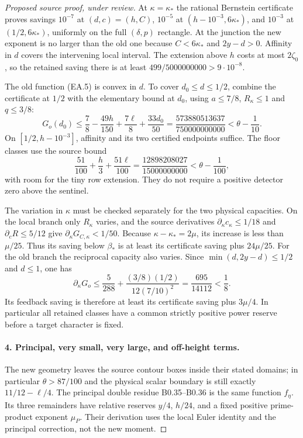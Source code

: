 \begin{proof}[Proposed source proof, under review]
At $\kappa=\kappa_*$ the rational Bernstein certificate proves savings
$10^{-7}$ at $(d,c)=(h,C)$, $10^{-5}$ at
$(h-10^{-3},6\kappa_*)$, and $10^{-3}$ at
$(1/2,6\kappa_*)$, uniformly on the full $(\delta,p)$ rectangle.
At the junction the new exponent is no larger than the old one because
$C<6\kappa_*$ and $2y-d>0$. Affinity in $d$ covers the intervening
local interval. The extension above $h$ costs at most $2\zeta_0$, so
the retained saving there is at least $499/5000000000>9\cdot10^{-8}$.

The old function (EA.5) is convex in $d$. To cover $d_0\le d\le1/2$,
combine the certificate at $1/2$ with the elementary bound at $d_0$,
using $a\le7/8$, $R_\kappa\le1$ and $q\le3/8$:
\[
 G_o(d_0)\le\frac78-\frac{49h}{150}+\frac{7\ell}{8}
                  +\frac{33d_0}{50}
 =\frac{573880513637}{750000000000}<\theta-\frac1{10}.
\]
On $[1/2,h-10^{-3}]$, affinity and its two certified endpoints suffice.
The floor classes use the source bound
\[
 \frac{51}{100}+\frac h3+\frac{51\ell}{100}
 =\frac{12898208027}{15000000000}<\theta-\frac1{100},
\]
with room for the tiny row extension. They do not require a positive
detector zero above the sentinel.

The variation in $\kappa$ must be checked separately for the two
physical capacities. On the local branch only $R_\kappa$ varies, and
the source derivatives $\partial_\kappa c_\kappa\le1/18$ and
$\partial_cR\le5/12$ give $\partial_\kappa G_{C,\kappa}<1/50$.
Because $\kappa-\kappa_*=2\mu$, its increase is less than
$\mu/25$. Thus its saving below $\beta_*$ is at least its certificate
saving plus $24\mu/25$.
For the old branch the reciprocal capacity also varies. Since
$\min(d,2y-d)\le1/2$ and $d\le1$, one has
\[
 \partial_\kappa G_o
 \le\frac5{288}+\frac{(3/8)(1/2)}{12(7/10)^2}
 =\frac{695}{14112}<\frac18.
\]
Its feedback saving is therefore at least its certificate saving plus
$3\mu/4$. In particular all retained classes have a common strictly
positive power reserve before a target character is fixed.

\paragraph{4. Principal, very small, very large, and off-height terms.}
The new geometry leaves the source contour boxes inside their stated
domains; in particular $\theta>87/100$ and the physical scalar boundary
is still exactly $11/12-\ell/4$. The principal double residue B0.35--B0.36
is the same function $f_\eta$. Its three remainders have relative
reserves $y/4$, $h/24$, and a fixed positive prime-product exponent
$\mu_P$. Their derivation uses the local Euler identity and the
principal correction, not the new moment.


\end{proof}
